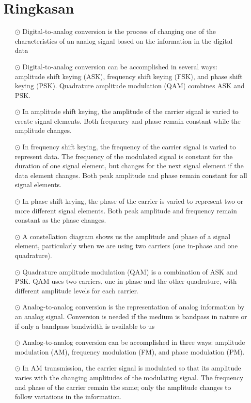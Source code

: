 \section{Ringkasan}
\begin{itemize}
  \item[$\odot$] Digital-to-analog conversion is the process of changing one of the characteristics of an analog signal based on the information in the digital data
  \item[$\odot$] Digital-to-analog conversion can be accomplished in several ways: amplitude shift keying (ASK), frequency shift keying (FSK), and phase shift keying (PSK). Quadrature amplitude modulation (QAM) combines ASK and PSK.
  \item[$\odot$] In amplitude shift keying, the amplitude of the carrier signal is varied to create signal elements. Both frequency and phase remain constant while the amplitude changes.
  \item[$\odot$] In frequency shift keying, the frequency of the carrier signal is varied to represent data. The frequency of the modulated signal is constant for the duration of one signal element, but changes for the next signal element if the data element changes. Both peak amplitude and phase remain constant for all signal elements.
  \item[$\odot$] In phase shift keying, the phase of the carrier is varied to represent two or more different signal elements. Both peak amplitude and frequency remain constant as the phase changes.
  \item[$\odot$] A constellation diagram shows us the amplitude and phase of a signal element, particularly when we are using two carriers (one in-phase and one quadrature).
  \item[$\odot$] Quadrature amplitude modulation (QAM) is a combination of ASK and PSK. QAM uses two carriers, one in-phase and the other quadrature, with different amplitude levels for each carrier.
  \item[$\odot$] Analog-to-analog conversion is the representation of analog information by an analog signal. Conversion is needed if the medium is bandpass in nature or if only a bandpass bandwidth is available to us
  \item[$\odot$] Analog-to-analog conversion can be accomplished in three ways: amplitude modulation (AM), frequency modulation (FM), and phase modulation (PM).
  \item[$\odot$] In AM transmission, the carrier signal is modulated so that its amplitude varies with the changing amplitudes of the modulating signal. The frequency and phase of the carrier remain the same; only the amplitude changes to follow variations in the information.

\end{itemize}
